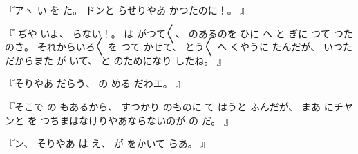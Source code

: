 『アヽ
い
を
た。
%
ドンと
らせりやあ
かつたのに！。
』

『
ぢや
いよ、
%
らない！。
%
は
がつて〳〵{}、
%
のあるのを
ひに
へ
と
ぎに
つて
つたのさ。
%
それからいろ〳〵
を
つて
かせて、
%
とう〳〵
へ
くやうに
たんだが、
%
いつた
だからまた
が
いて、
%
と
のためになり
したね。
』

『そりやあ
だらう、
%
の
める
だわエ。
』

『そこで
の
もあるから、
%
すつかり
のものに
て
はうと
ふんだが、
%
まあ
にチヤンと
を
つちまはなけりやあならないのが
の
だ。
』

『ン、
%
そりやあ
は
え、
%
が
をかいて
らあ。
』
